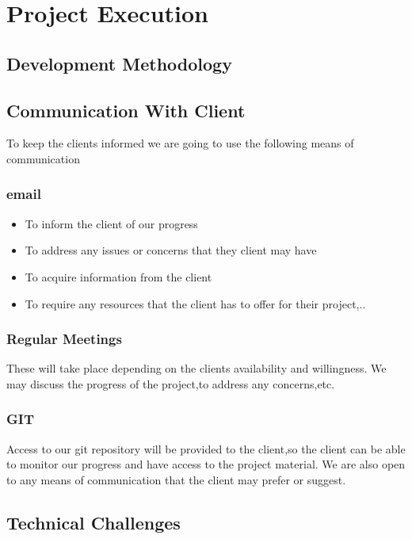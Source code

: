 \documentclass[a4paper,12pt]{article}
\begin{document}
\section{Project Execution}
\subsection{Development Methodology}
\subsection{Communication With Client}
To keep the clients informed we are going to use the following means of communication
\subsubsection{email}
\begin{itemize}
\item To inform the client of our progress
\item To address any issues or concerns that they client may have
\item To acquire information from the client
\item To require any resources that the client has to offer for their project,..
\end{itemize}
\subsubsection{Regular Meetings}
These will take place depending on the clients availability and willingness.
We may discuss the progress of the project,to address any concerns,etc.
\subsubsection{GIT}
Access to our git repository will be provided to the client,so the client can be able to monitor
our progress and have access to the project material.
We are also open to any means of communication that the client may prefer or suggest.
\subsection{Technical Challenges}
\end{document}
